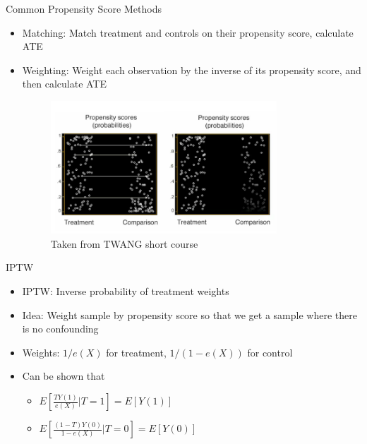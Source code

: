 \begin{frame}{Common Propensity Score Methods}
\begin{itemize}
 \item Matching: Match treatment and controls on their propensity score, calculate ATE
 \item Weighting: Weight each observation by the inverse of its propensity score, and then calculate ATE
 
  \begin{figure}[h!]
  \centering
    \includegraphics[width=0.8\textwidth]{ps_examples.png}
    \caption{Taken from TWANG short course \cite{Rand2015}}
\label{fig:psexamp}

\end{figure}
\end{itemize}


\end{frame}

\begin{frame}{IPTW}
\begin{itemize}
\item IPTW: Inverse probability of treatment weights
\item Idea: Weight sample by propensity score so that we get a sample where there is no confounding
\item Weights: $1/e(X)$ for treatment, $1/(1-e(X))$ for control
\item Can be shown that 
\begin{itemize}
 \item $E[\frac{TY(1)}{e(X)}|T=1]=E[Y(1)]$
 \item $E[\frac{(1-T)Y(0)}{1-e(X)}|T=0]=E[Y(0)]$
\end{itemize}
 
\end{itemize}

\end{frame}

